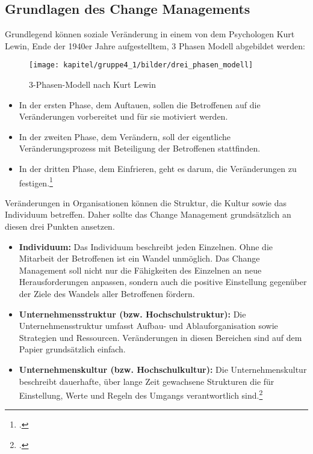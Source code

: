 \subsection{Grundlagen des Change Managements}
Grundlegend können soziale Veränderung in einem von dem Psychologen Kurt Lewin, Ende der 1940er Jahre aufgestelltem, 3 Phasen Modell abgebildet werden:

\begin{figure}[h!]
	\centering
	\texttt{[image: kapitel/gruppe4\_1/bilder/drei\_phasen\_modell]}
	\caption{3-Phasen-Modell nach Kurt Lewin}
	\label{fig_drei_phasen_modell}
\end{figure}

\begin{itemize}
	\item In der ersten Phase, dem Auftauen, sollen die Betroffenen auf die Veränderungen vorbereitet und für sie motiviert werden. 
	\item In der zweiten Phase, dem Verändern, soll der eigentliche Veränderungsprozess mit Beteiligung der Betroffenen stattfinden. 
	\item In der dritten Phase, dem Einfrieren,  geht es darum, die Veränderungen zu festigen.\footcite[Vgl.][]{lauer_change_2014}
\end{itemize}


Veränderungen in Organisationen können die Struktur, die Kultur sowie das Individuum betreffen. Daher sollte das Change Management grundsätzlich an diesen drei Punkten ansetzen.
\begin{itemize}
	\item \textbf{Individuum:} Das Individuum beschreibt jeden Einzelnen. Ohne die Mitarbeit der Betroffenen ist ein Wandel unmöglich. Das Change Management soll nicht nur die Fähigkeiten des Einzelnen an neue Herausforderungen anpassen, sondern auch die positive Einstellung gegenüber der Ziele des Wandels aller Betroffenen fördern.
	\item \textbf{Unternehmensstruktur (bzw. Hochschulstruktur):} Die Unternehmensstruktur umfasst Aufbau- und Ablauforganisation sowie Strategien und Ressourcen. Veränderungen in diesen Bereichen sind auf dem Papier grundsätzlich einfach.
	\item \textbf{Unternehmenskultur (bzw. Hochschulkultur):} Die Unternehmenskultur beschreibt dauerhafte, über lange Zeit gewachsene Strukturen die für Einstellung, Werte und Regeln des Umgangs verantwortlich sind.\footcite[Vgl.][]{lauer_change_2014}
\end{itemize}

